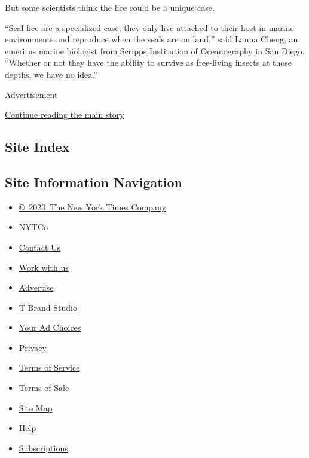 But some scientists think the lice could be a unique case.

``Seal lice are a specialized case; they only live attached to their
host in marine environments and reproduce when the seals are on land,''
said Lanna Cheng, an emeritus marine biologist from Scripps Institution
of Oceanography in San Diego. ``Whether or not they have the ability to
survive as free-living insects at those depths, we have no idea.''

Advertisement

\protect\hyperlink{after-bottom}{Continue reading the main story}

\hypertarget{site-index}{%
\subsection{Site Index}\label{site-index}}

\hypertarget{site-information-navigation}{%
\subsection{Site Information
Navigation}\label{site-information-navigation}}

\begin{itemize}
\tightlist
\item
  \href{https://help.nytimes3xbfgragh.onion/hc/en-us/articles/115014792127-Copyright-notice}{©~2020~The
  New York Times Company}
\end{itemize}

\begin{itemize}
\tightlist
\item
  \href{https://www.nytco.com/}{NYTCo}
\item
  \href{https://help.nytimes3xbfgragh.onion/hc/en-us/articles/115015385887-Contact-Us}{Contact
  Us}
\item
  \href{https://www.nytco.com/careers/}{Work with us}
\item
  \href{https://nytmediakit.com/}{Advertise}
\item
  \href{http://www.tbrandstudio.com/}{T Brand Studio}
\item
  \href{https://www.nytimes3xbfgragh.onion/privacy/cookie-policy\#how-do-i-manage-trackers}{Your
  Ad Choices}
\item
  \href{https://www.nytimes3xbfgragh.onion/privacy}{Privacy}
\item
  \href{https://help.nytimes3xbfgragh.onion/hc/en-us/articles/115014893428-Terms-of-service}{Terms
  of Service}
\item
  \href{https://help.nytimes3xbfgragh.onion/hc/en-us/articles/115014893968-Terms-of-sale}{Terms
  of Sale}
\item
  \href{https://spiderbites.nytimes3xbfgragh.onion}{Site Map}
\item
  \href{https://help.nytimes3xbfgragh.onion/hc/en-us}{Help}
\item
  \href{https://www.nytimes3xbfgragh.onion/subscription?campaignId=37WXW}{Subscriptions}
\end{itemize}
